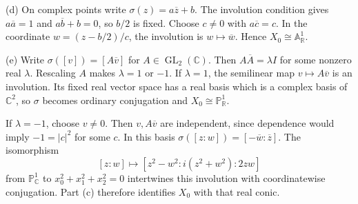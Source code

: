 (d) On complex points write $\sigma(z)=a\overline z+b$. The involution condition gives $a\overline a=1$ and $a\overline b+b=0$, so $b/2$ is fixed. Choose $c\ne0$ with $a\overline c=c$. In the coordinate $w=(z-b/2)/c$, the involution is $w\mapsto\overline w$. Hence $X_0\cong\mathbb A_{\mathbb R}^1$.

(e) Write $\sigma([v])=[A\overline v]$ for $A\in\operatorname{GL}_2(\mathbb C)$. Then $A\overline A=\lambda I$ for some nonzero real $\lambda$. Rescaling $A$ makes $\lambda=1$ or $-1$. If $\lambda=1$, the semilinear map $v\mapsto A\overline v$ is an involution. Its fixed real vector space has a real basis which is a complex basis of $\mathbb C^2$, so $\sigma$ becomes ordinary conjugation and $X_0\cong\mathbb P_{\mathbb R}^1$.

If $\lambda=-1$, choose $v\ne0$. Then $v,A\overline v$ are independent, since dependence would imply $-1=|c|^2$ for some $c$. In this basis $\sigma([z:w])=[-\overline w:\overline z]$. The isomorphism
\[[z:w]\mapsto[z^2-w^2:i(z^2+w^2):2zw]\]
from $\mathbb P_{\mathbb C}^1$ to $x_0^2+x_1^2+x_2^2=0$ intertwines this involution with coordinatewise conjugation. Part (c) therefore identifies $X_0$ with that real conic.

